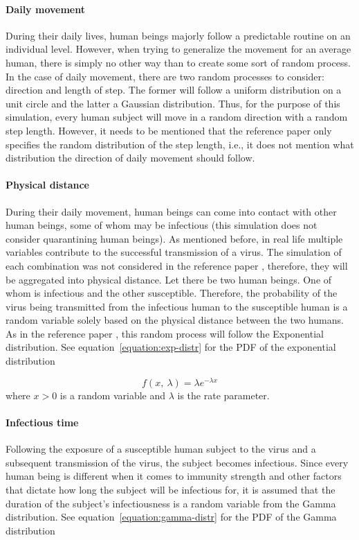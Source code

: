 \documentclass[a4paper]{article}
\begin{document}
\paragraph{Daily movement}
During their daily lives, human beings majorly follow a predictable routine on an individual level. However, when trying to generalize the movement for an average human, there is simply no other way than to create some sort of random process. In the case of daily movement, there are two random processes to consider: direction and length of step. The former will follow a uniform distribution on a unit circle and the latter a Gaussian distribution. Thus, for the purpose of this simulation, every human subject will move in a random direction with a random step length. However, it needs to be mentioned that the reference paper \cite{Maltezos2021} only specifies the random distribution of the step length, i.e., it does not mention what distribution the direction of daily movement should follow.

\paragraph{Physical distance}
During their daily movement, human beings can come into contact with other human beings, some of whom may be infectious (this simulation does not consider quarantining human beings). As mentioned before, in real life multiple variables contribute to the successful transmission of a virus. The simulation of each combination was not considered in the reference paper \cite{Maltezos2021}, therefore, they will be aggregated into physical distance. Let there be two human beings. One of whom is infectious and the other susceptible. Therefore, the probability of the virus being transmitted from the infectious human to the susceptible human is a random variable solely based on the physical distance between the two humans. As in the reference paper \cite{Maltezos2021}, this random process will follow the Exponential distribution. See equation~\ref{equation:exp-distr} for the PDF of the exponential distribution

\begin{equation}
	f(x,\:\lambda) = \lambda e^{-\lambda x}
	\label{equation:exp-distr}
\end{equation}
\noindent
where $x > 0$ is a random variable and $\lambda$ is the rate parameter.

\paragraph{Infectious time}
Following the exposure of a susceptible human subject to the virus and a subsequent transmission of the virus, the subject becomes infectious. Since every human being is different when it comes to immunity strength and other factors that dictate how long the subject will be infectious for, it is assumed that the duration of the subject's infectiousness is a random variable from the Gamma distribution. See equation~\ref{equation:gamma-distr} for the PDF of the Gamma distribution
\end{document}
